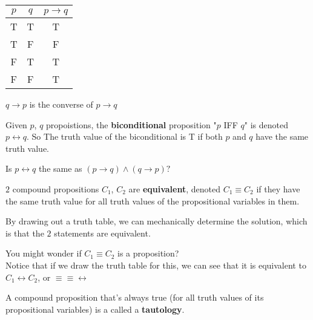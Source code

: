 \documentclass[11pt]{scrartcl}
\begin{document}
\begin{center}
\begin{tabular}{ |c|c|c| } 
 \hline
 $p$ & $q$ & $p \rightarrow q$ \\ 
 \hline
 T & T & T \\ 
 \hline
 T & F & F \\ 
 \hline
 F & T & T\\
 \hline
 F & F & T\\
 \hline
\end{tabular}
\end{center}
\newline
\begin{definition}
    $q\rightarrow p$ is the converse of $p \rightarrow q$
\end{definition}
     
\newline
  
\begin{definition}[biconditional]
    Given $p$, $q$ propoistions, the \textbf{biconditional} proposition "$p$ IFF $q$" is denoted $p \leftrightarrow q$.  So The truth value of the biconditional is T if both $p$ and $q$ have the same truth value.
\end{definition}


\begin{problem}
    Is $p \leftrightarrow q$ the same as $(p \rightarrow q)\wedge (q\rightarrow p)?$

\begin{definition}[equivalence]
    $2$ compound propositions $C_1$, $C_2$ are \textbf{equivalent}, denoted $C_1 \equiv C_2$ if they have the same truth value for all truth values of the propositional variables in them.
\end{definition}
By drawing out a truth table, we can mechanically determine the solution, which is that the $2$ statements are equivalent.
\end{problem}

\begin{remark}
    You might wonder if $C_1 \equiv C_2$ is a proposition?\\
    Notice that if we draw the truth table for this, we can see that it is equivalent to $C_1 \leftrightarrow C_2$, or $\equiv \equiv \leftrightarrow$
\end{remark}

\begin{definition}[Tautology]
    A compound proposition that's always true (for all truth values of its propositional variables) is a called a \textbf{tautology}. 
\end{definition}
\end{document}
